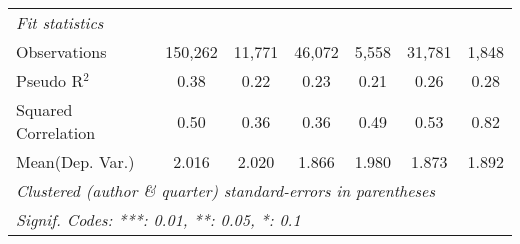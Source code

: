 \begin{tabular}{lcccccc}
   \midrule
   \emph{Fit statistics}\\
   Observations                                               & 150,262 & 11,771       & 46,072         & 5,558        & 31,781       & 1,848\\  
   Pseudo R$^2$                                               & 0.38    & 0.22         & 0.23           & 0.21         & 0.26         & 0.28\\  
   Squared Correlation                                        & 0.50    & 0.36         & 0.36           & 0.49         & 0.53         & 0.82\\  
Mean(Dep. Var.) & 2.016 & 2.020 & 1.866 & 1.980 & 1.873 & 1.892 \\
   \midrule \midrule
   \multicolumn{7}{l}{\emph{Clustered (author \& quarter) standard-errors in parentheses}}\\
   \multicolumn{7}{l}{\emph{Signif. Codes: ***: 0.01, **: 0.05, *: 0.1}}\\
\end{tabular}
\par\endgroup
